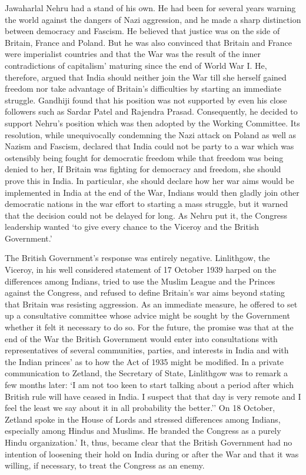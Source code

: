 \begin{multicols}{2}
Jawaharlal Nehru had a stand of his own. He had been for several years warning the world against the dangers of Nazi aggression, and he made a sharp distinction between democracy and Fascism. He believed that justice was on the side of Britain, France and Poland. But he was also convinced that Britain and France were imperialist countries and that the War was the result of the inner contradictions of capitalism' maturing since the end of World War I. He, therefore, argued that India should neither join the War till she herself gained freedom nor take advantage of Britain's difficulties by starting an immediate struggle. Gandhiji found that his position was not supported by even his close followers such as Sardar Patel and Rajendra Prasad. Consequently, he decided to support Nehru's position which was then adopted by the Working Committee. Its resolution, while unequivocally condemning the Nazi attack on Poland as well as Nazism and Fascism, declared that India could not be party to a war which was ostensibly being fought for democratic freedom while that freedom was being denied to her, If Britain was fighting for democracy and freedom, she should prove this in India. In particular, she should declare how her war aims would be implemented in India at the end of the War, Indians would then gladly join other democratic nations in the war effort to starting a mass struggle, but it warned that the decision could not be delayed for long. As Nehru put it, the Congress leadership wanted `to give every chance to the Viceroy and the British Government.' 

The British Government's response was entirely negative. Linlithgow, the Viceroy, in his well considered statement of 17 October 1939 harped on the differences among Indians, tried to use the Muslim League and the Princes against the Congress, and refused to define Britain's war aims beyond stating that Britain was resisting aggression. As an immediate measure, he offered to set up a consultative committee whose advice might be sought by the Government whether it felt it necessary to do so. For the future, the promise was that at the end of the War the British Government would enter into consultations with representatives of several communities, parties, and interests in India and with the Indian princes' as to how the Act of 1935 might be modified. In a private communication to Zetland, the Secretary of State, Linlithgow was to remark a few months later: `I am not too keen to start talking about a period after which British rule will have ceased in India. I suspect that that day is very remote and I feel the least we say about it in all probability the better.'' On 18 October, Zetland spoke in the House of Lords and stressed differences among Indians, especially among Hindus and Muslims. He branded the Congress as a purely Hindu organization.' It, thus, became clear that the British Government had no intention of loosening their hold on India during or after the War and that it was willing, if necessary, to treat the Congress as an enemy. 


\end{multicols}
